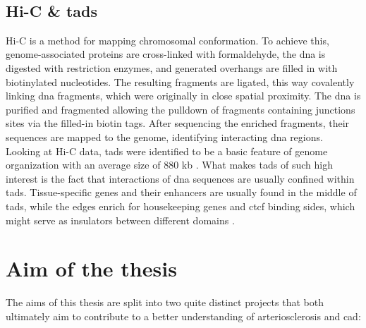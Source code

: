     \subsection{Hi-C \& \acsp{tad}}
    Hi-C is a method for mapping chromosomal conformation. To achieve this, genome-associated proteins are cross-linked with formaldehyde, the \ac{dna} is digested with restriction enzymes, and generated overhangs are filled in with biotinylated nucleotides. The resulting fragments are ligated, this way covalently linking \ac{dna} fragments, which were originally in close spatial proximity. The \ac{dna} is purified and fragmented allowing the pulldown of fragments containing junctions sites via the filled-in biotin tags. After sequencing the enriched fragments, their sequences are mapped to the genome, identifying interacting \ac{dna} regions. \cite{lieberman-aidenComprehensiveMappingLongRange2009, witDecade3CTechnologies2012}\\
    Looking at Hi-C data, \acp{tad} were identified to be a basic feature of genome organization with an average size of 880 kb \cite{dixonTopologicalDomainsMammalian2012, wang3DGenomeBrowser2018}. What makes \acp{tad} of such high interest is the fact that interactions of \ac{dna} sequences are usually confined within \acp{tad}. Tissue-specific genes and their enhancers are usually found in the middle of \acp{tad}, while the edges enrich for housekeeping genes and \ac{ctcf} binding sides, which might serve as insulators between different domains \cite{pomboThreedimensionalGenomeArchitecture2015}.


\section{Aim of the thesis}
\label{sec:Aim}
The aims of this thesis are split into two quite distinct projects that both ultimately aim to contribute to a better understanding of arteriosclerosis and \ac{cad}:

